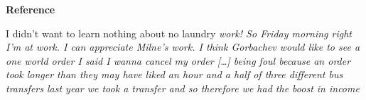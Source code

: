 \begin{exe}

  \ex\label{ex:4.4}

  \vspace{1.5em}
  \textbf{Reference}
  \begin{xlist}
    \ex\label{ex:4.4a} I didn't want to learn nothing about no laundry \em{work}! \vspace{-1.25em} %
    \ex\label{ex:4.4b} So Friday morning right I'm at \em{work}. \vspace{-1.25em} %
    \ex\label{ex:4.4c} I can appreciate Milne's \em{work}. \vspace{-1.25em} %
    \vspace{1.5em}
    \ex\label{ex:4.4d} I think Gorbachev would like to see a one world	\em{order} \vspace{-1.25em} %
    \ex\label{ex:4.4e} I said I wanna cancel my \em{order} \vspace{-1.25em} %
    \ex\label{ex:4.4f} […] being foul because an \em{order} took longer than they may have liked \vspace{-1.25em} %
    \vspace{1.5em}
    \ex\label{ex:4.4g} an hour and a half of three different bus \em{transfers} \vspace{-1.25em} %
    \ex\label{ex:4.4h} last year we took a transfer and so therefore we had the boost in income  %
  \end{xlist}


\end{exe}

